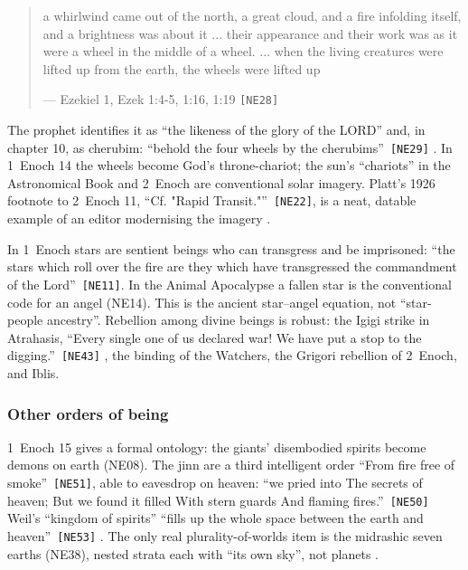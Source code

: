 \documentclass[11pt,a4paper]{article}
\newcommand{\pid}[1]{\texttt{\small #1}}
\begin{document}
\begin{quote}\small a whirlwind came out of the north, a great cloud, and a fire infolding itself, and a brightness was about it ... their appearance and their work was as it were a wheel in the middle of a wheel. ... when the living creatures were lifted up from the earth, the wheels were lifted up\par\hfill{\footnotesize --- Ezekiel 1, Ezek 1:4-5, 1:16, 1:19 \pid{[NE28]}}\end{quote}

The prophet identifies it as ``the likeness of the glory of the LORD'' and, in chapter 10, as cherubim: \enquote{behold the four wheels by the cherubims}~\pid{[NE29]} \parencite{kjv1611}. In 1~Enoch 14 the wheels become God's throne-chariot; the sun's ``chariots'' in the Astronomical Book and 2~Enoch are conventional solar imagery. Platt's 1926 footnote to 2~Enoch 11, \enquote{Cf. "Rapid Transit."}~\pid{[NE22]}, is a neat, datable example of an editor modernising the imagery \parencite{platt1926forgotten}.

In 1~Enoch stars are sentient beings who can transgress and be imprisoned: \enquote{the stars which roll over the fire are they which have transgressed the commandment of the Lord}~\pid{[NE11]}. In the Animal Apocalypse a fallen star is the conventional code for an angel (NE14). This is the ancient star--angel equation, not ``star-people ancestry''. Rebellion among divine beings is robust: the Igigi strike in Atrahasis, \enquote{Every single one of us declared war! We have put a stop to the digging.}~\pid{[NE43]} \parencite{dalley1989myths}, the binding of the Watchers, the Grigori rebellion of 2~Enoch, and Iblis.

\subsubsection{Other orders of being}

1~Enoch 15 gives a formal ontology: the giants' disembodied spirits become demons on earth (NE08). The jinn are a third intelligent order \enquote{From fire free of smoke}~\pid{[NE51]}, able to eavesdrop on heaven: \enquote{we pried into The secrets of heaven; But we found it filled With stern guards And flaming fires.}~\pid{[NE50]} Weil's ``kingdom of spirits'' \enquote{fills up the whole space between the earth and heaven}~\pid{[NE53]} \parencite{weil1846bible}. The only real plurality-of-worlds item is the midrashic seven earths (NE38), nested strata each with ``its own sky'', not planets \parencite{ginzberg1909legends}.
\end{document}
